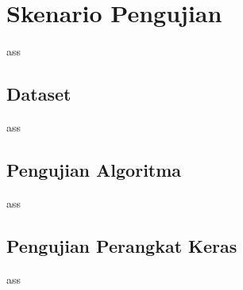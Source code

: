 \section{Skenario Pengujian}
ass

\subsection{Dataset}
ass

\subsection{Pengujian Algoritma}
ass

\subsection{Pengujian Perangkat Keras}
ass
